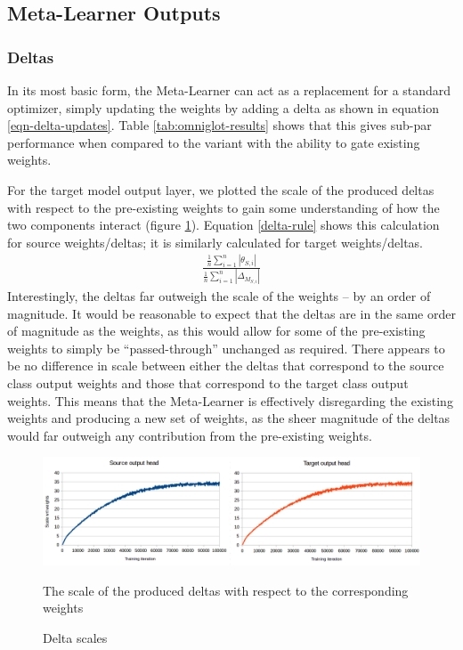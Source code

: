 \documentclass{report}
\newcommand\ddfrac[2]{\frac{\displaystyle #1}{\displaystyle #2}}
\begin{document}
\subsection{Meta-Learner Outputs}
\subsubsection{Deltas}
In its most basic form, the Meta-Learner can act as a replacement for a standard optimizer, simply updating the weights by adding a delta as shown in equation \ref{eqn-delta-updates}. Table \ref{tab:omniglot-results} shows that this gives sub-par performance when compared to the variant with the ability to gate existing weights. \par
For the target model output layer, we plotted the scale of the produced deltas with respect to the pre-existing weights to gain some understanding of how the two components interact (figure \ref{fig:deltascale:1}). Equation \ref{delta-rule} shows this calculation for source weights/deltas; it is similarly calculated for target weights/deltas.
\begin{align} \label{delta-rule}
\ddfrac{\frac{1}{n}\sum_{i=1}^{n}|\theta_{S,i}|}{\frac{1}{n}\sum_{i=1}^{n}|\Delta_{M_{S,i}}|}
\end{align}
Interestingly, the deltas far outweigh the scale of the weights -- by an order of magnitude. It would be reasonable to expect that the deltas are in the same order of magnitude as the weights, as this would allow for some of the pre-existing weights to simply be ``passed-through'' unchanged as required. There appears to be no difference in scale between either the deltas that correspond to the source class output weights and those that correspond to the target class output weights. This means that the Meta-Learner is effectively disregarding the existing weights and producing a new set of weights, as the sheer magnitude of the deltas would far outweigh any contribution from the pre-existing weights.

\begin{figure}[h!]
	\centering
	\includegraphics[width=16cm]{deltascale}
	\caption{Delta scales}
	The scale of the produced deltas with respect to the corresponding weights
	\label{fig:deltascale:1}
\end{figure}
\end{document}
